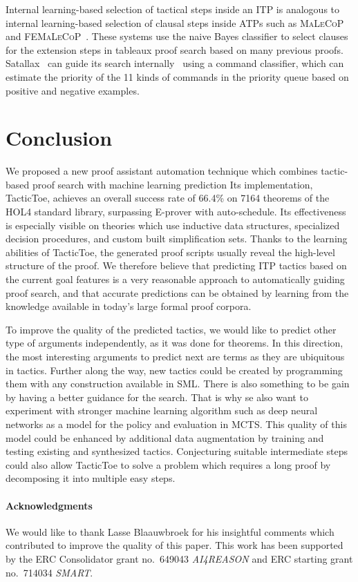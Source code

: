 \documentclass[runningheads,a4paper,draft]{svjour3}
\def\holfour{\textsf{HOL4}\xspace}
\def\eprover{\textsf{E-prover}\xspace}
\def\sml{\textsf{SML}\xspace}
\def\tactictoe{\textsf{TacticToe}\xspace}
\begin{document}
Internal learning-based selection of tactical steps inside an ITP is analogous
to internal learning-based selection of clausal steps inside ATPs such as
\textsc{MaLeCoP}~\cite{malecop} and \textsc{FEMaLeCoP}~\cite{femalecop}. These
systems
use the naive Bayes classifier to  select clauses for the extension steps in
tableaux proof search based on many previous proofs. Satallax~\cite{Brown2012a}
can guide its
search internally~\cite{mllax} using a command classifier, which can estimate
the priority of the 11 kinds of
commands in the priority queue based on positive and negative examples.

\section{Conclusion}\label{sec:concl}
We proposed a new proof assistant automation technique which combines
tactic-based proof search with machine learning prediction
Its implementation, \tactictoe, achieves an overall success rate of 66.4\%
on 7164 theorems of the \holfour standard library, surpassing \eprover
with auto-schedule. Its
effectiveness is especially visible on
theories which use inductive data structures, specialized decision procedures,
and custom built simplification sets.
Thanks to the learning abilities of \tactictoe, the generated proof scripts
usually reveal the high-level structure of the proof. %
We therefore believe that predicting ITP tactics based on the current goal
features is a very reasonable approach to automatically guiding proof search,
and that accurate predictions can be obtained by learning from the knowledge
available in today's large formal proof corpora.

To improve the quality of the predicted tactics,
we would like to predict other type of arguments independently, as it was done
for theorems. In this direction, the most interesting arguments to
predict next are terms as they are ubiquitous in tactics. Further along the way,
new tactics could be created by programming them with any construction
available in \sml. There is also something to be gain by
having a better guidance for the search.
That is why se also want to experiment with stronger machine learning algorithm
such as deep neural networks as a model for the policy and evaluation in MCTS.
This quality of this model could be enhanced by additional data augmentation by
training and testing existing and synthesized tactics.
Conjecturing suitable intermediate steps could also allow \tactictoe to solve
a problem which requires a long proof by decomposing it into multiple easy
steps.

\paragraph{Acknowledgments}\label{sect:acks}
We would like to thank Lasse Blaauwbroek for his insightful comments which
contributed to improve the quality of this paper. This work has been supported
by the ERC Consolidator grant no.\ 649043 \textit{AI4REASON} and ERC starting
grant no.\ 714034 \textit{SMART}.



\end{document}
